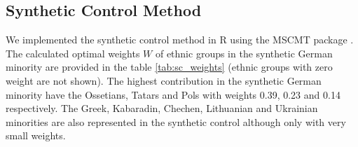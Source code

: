 

\subsection{Synthetic Control Method}
We implemented the synthetic control method in R  using the MSCMT package \citep{becker_fast_2018}. The calculated optimal weights $W$ of ethnic groups in the synthetic German minority are provided in the table \ref{tab:sc_weights} (ethnic groups with zero weight are not shown). The highest contribution in the synthetic German minority have the Ossetians, Tatars and Pols with weights 0.39, 0.23 and 0.14 respectively. The Greek, Kabaradin, Chechen, Lithuanian and Ukrainian minorities are also represented in the synthetic control although only with very small weights. 



